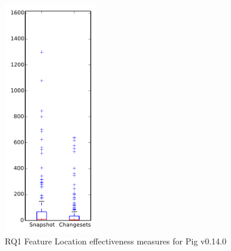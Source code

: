 
\begin{figure}[t]
\centering
\includegraphics[width=0.36\textwidth]{figures/flt/rq1_pig}
\caption{RQ1 Feature Location effectiveness measures for Pig v0.14.0}
\label{fig:flt:rq1:pig}
\end{figure}
